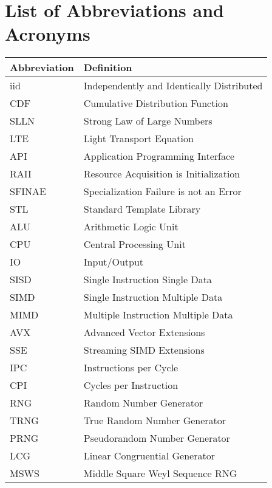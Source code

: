 \documentclass{stdlocal}
\begin{document}
  \section*{List of Abbreviations and Acronyms}

  \begin{table}[H]
    \center
    \renewcommand{\arraystretch}{1.3}
    \begin{tabularx}{\textwidth}{lX}
      \hline
      \textbf{Abbreviation} & \textbf{Definition} \\
      \hline
      \hline
      iid & Independently and Identically Distributed \\
      CDF & Cumulative Distribution Function \\
      SLLN & Strong Law of Large Numbers \\
      LTE & Light Transport Equation \\
      \hline
      API & Application Programming Interface \\
      RAII & Resource Acquisition is Initialization \\
      SFINAE & Specialization Failure is not an Error \\
      STL & Standard Template Library \\
      \hline
      ALU & Arithmetic Logic Unit \\
      CPU & Central Processing Unit \\
      IO & Input/Output \\
      SISD & Single Instruction Single Data \\
      SIMD & Single Instruction Multiple Data \\
      MIMD & Multiple Instruction Multiple Data \\
      AVX & Advanced Vector Extensions \\
      SSE & Streaming SIMD Extensions \\
      IPC & Instructions per Cycle \\
      CPI & Cycles per Instruction \\
      \hline
      RNG & Random Number Generator \\
      TRNG & True Random Number Generator \\
      PRNG & Pseudorandom Number Generator \\
      LCG & Linear Congruential Generator \\
      MSWS & Middle Square Weyl Sequence RNG \\
      \hline
    \end{tabularx}
  \end{table}
\end{document}
